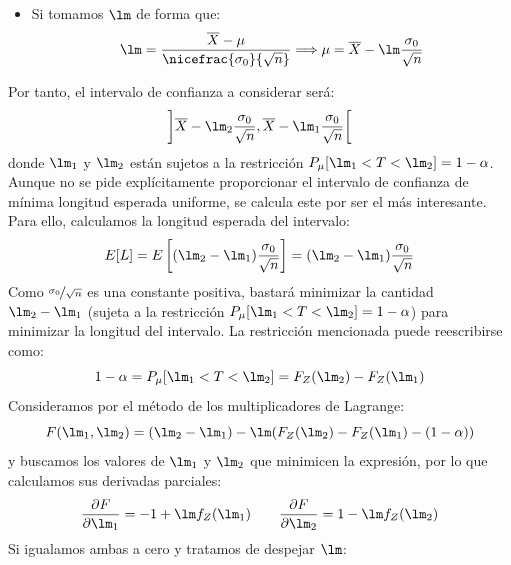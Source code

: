 \begin{ejercicio}
\begin{itemize}
        En efecto, es estrictamente decreciente respecto $\mu$.
        \item Si tomamos $\lm$ de forma que:
            \begin{equation*}
                \lm = \frac{\overline{X}-\mu}{\nicefrac{\sigma_0}{\sqrt{n}}} \Longrightarrow \mu = \overline{X} - \lm \frac{\sigma_0}{\sqrt{n}}
            \end{equation*}
    \end{itemize}
    Por tanto, el intervalo de confianza a considerar será:
    \begin{equation*}
        \left]\overline{X}-\lm_2 \frac{\sigma_0}{\sqrt{n}}, \overline{X}-\lm_1 \frac{\sigma_0}{\sqrt{n}}\right[
    \end{equation*}
    donde $\lm_1$ y $\lm_2$ están sujetos a la restricción $P_\mu[\lm_1<T<\lm_2]=1-\alpha$. Aunque no se pide explícitamente proporcionar el intervalo de confianza de mínima longitud esperada uniforme, se calcula este por ser el más interesante. Para ello, calculamos la longitud esperada del intervalo:
    \begin{equation*}
        E[L] = E\left[(\lm_2-\lm_1)\frac{\sigma_0}{\sqrt{n}}\right] = (\lm_2-\lm_1)\frac{\sigma_0}{\sqrt{n}}
    \end{equation*}
    Como $\nicefrac{\sigma_0}{\sqrt{n}}$ es una constante positiva, bastará minimizar la cantidad $\lm_2-\lm_1$ (sujeta a la restricción $P_\mu[\lm_1<T<\lm_2]=1-\alpha$) para minimizar la longitud del intervalo. La restricción mencionada puede reescribirse como: 
    \begin{equation*}
        1-\alpha = P_\mu[\lm_1<T<\lm_2] = F_Z(\lm_2) - F_Z(\lm_1)
    \end{equation*}
    Consideramos por el método de los multiplicadores de Lagrange:
    \begin{equation*}
        F(\lm_1,\lm_2) = (\lm_2-\lm_1) - \lm(F_Z(\lm_2) - F_Z(\lm_1) - (1-\alpha))
    \end{equation*}
    y buscamos los valores de $\lm_1$ y $\lm_2$ que minimicen la expresión, por lo que calculamos sus derivadas parciales:
    \begin{equation*}
        \dfrac{\partial F}{\partial \lm_1} = -1+\lm f_Z(\lm_1) \qquad \dfrac{\partial F}{\partial \lm_2} = 1-\lm f_Z(\lm_2)
    \end{equation*}
    Si igualamos ambas a cero y tratamos de despejar $\lm$:
    \begin{equation*}
        \left.\begin{array}{l}

\end{array}
\end{equation*}
\end{ejercicio}
